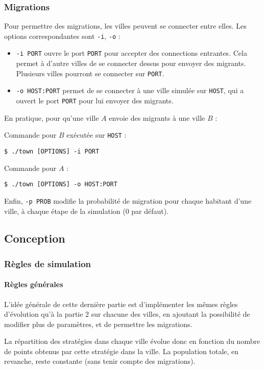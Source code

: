 \documentclass[10pt]{article}
\begin{document}
\subsubsection{Migrations}
Pour permettre des migrations, les villes peuvent se connecter entre elles.
Les options correspondantes sont \verb|-i|, \verb|-o| :
\begin{itemize}
\item \verb|-i PORT| ouvre le port \verb|PORT| pour accepter des connections entrantes. 
      Cela permet à d'autre villes de se connecter dessus pour envoyer des migrants.
      Plusieurs villes pourront se connecter sur \verb|PORT|.
\item \verb|-o HOST:PORT| permet de se connecter à une ville simulée sur \verb|HOST|, qui
      a ouvert le port \verb|PORT| pour lui envoyer des migrants.
\end{itemize}

En pratique, pour qu'une ville $A$ envoie des migrants à une ville $B$ :

Commande pour $B$ exécutée sur \verb|HOST| :
\begin{verbatim}
$ ./town [OPTIONS] -i PORT
\end{verbatim}

Commande pour $A$ :
\begin{verbatim}
$ ./town [OPTIONS] -o HOST:PORT
\end{verbatim}

Enfin, \verb|-p PROB| modifie la probabilité de migration pour chaque habitant d'une ville,
à chaque étape de la simulation (0 par défaut).


\subsection{Conception}
\subsubsection{Règles de simulation}
\paragraph{Règles générales}
L'idée générale de cette dernière partie est d'implémenter les mêmes règles d'évolution qu'à la partie 2 sur chacune des villes,
en ajoutant la possibilité de modifier plus de paramètres, et de permettre les migrations.

La répartition des stratégies dans chaque ville évolue donc en fonction du nombre de points obtenus par cette stratégie dans la ville.
La population totale, en revanche, reste constante (sans tenir compte des migrations).
\end{document}
